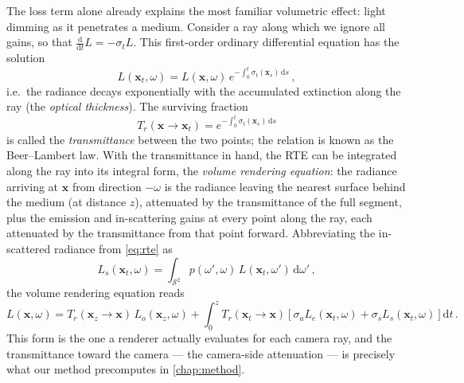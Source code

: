 The loss term alone already explains the most familiar volumetric effect: light dimming as it penetrates a medium. Consider a ray along which we ignore all gains, so that $\frac{\mathrm{d}}{\mathrm{d}t} L = -\sigma_t L$. This first-order ordinary differential equation has the solution
\begin{equation}
	L(\mathbf{x}_t, \omega) = L(\mathbf{x}, \omega) \, e^{-\int_0^t \sigma_t(\mathbf{x}_s) \,\mathrm{d}s} \,,
\end{equation}
i.e.\ the radiance decays exponentially with the accumulated extinction along the ray (the \emph{optical thickness}). The surviving fraction
\begin{equation}
	\label{eq:transmittance}
	T_r(\mathbf{x} \rightarrow \mathbf{x}_t) = e^{-\int_0^t \sigma_t(\mathbf{x}_s) \,\mathrm{d}s}
\end{equation}
is called the \emph{transmittance} between the two points; the relation is known as the Beer--Lambert law. With the transmittance in hand, the RTE can be integrated along the ray into its integral form, the \emph{volume rendering equation}: the radiance arriving at $\mathbf{x}$ from direction $-\omega$ is the radiance leaving the nearest surface behind the medium (at distance $z$), attenuated by the transmittance of the full segment, plus the emission and in-scattering gains at every point along the ray, each attenuated by the transmittance from that point forward. Abbreviating the in-scattered radiance from \cref{eq:rte} as
\begin{equation}
	\label{eq:inscatter}
	L_s(\mathbf{x}_t, \omega) = \int_{\mathcal{S}^2} p(\omega', \omega) \, L(\mathbf{x}_t, \omega') \,\mathrm{d}\omega' \,,
\end{equation}
the volume rendering equation reads
\begin{equation}
	\label{eq:vre}
	L(\mathbf{x}, \omega) = T_r(\mathbf{x}_z \rightarrow \mathbf{x}) \, L_o(\mathbf{x}_z, \omega)
	+ \int_0^z T_r(\mathbf{x}_t \rightarrow \mathbf{x}) \left[ \sigma_a L_e(\mathbf{x}_t, \omega) + \sigma_s L_s(\mathbf{x}_t, \omega) \right] \mathrm{d}t \,.
\end{equation}
This form is the one a renderer actually evaluates for each camera ray, and the transmittance toward the camera --- the camera-side attenuation --- is precisely what our method precomputes in \cref{chap:method}.


